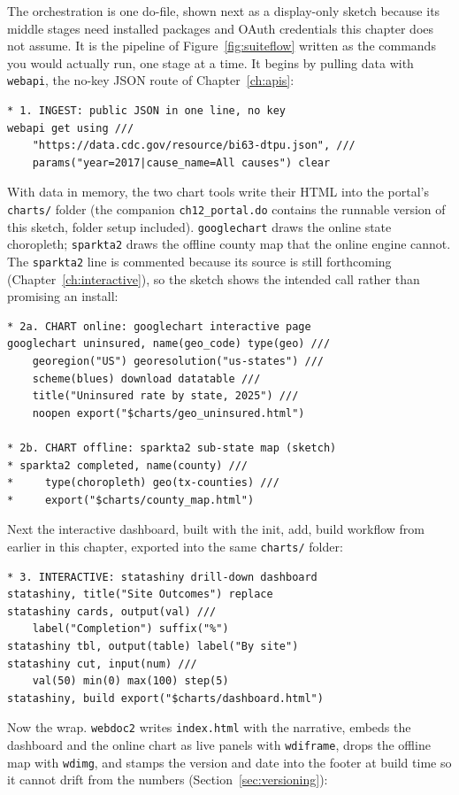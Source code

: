 The orchestration is one do-file, shown next as a display-only sketch because its middle stages need installed packages and OAuth credentials this chapter does not assume. It is the pipeline of Figure~\ref{fig:suiteflow} written as the commands you would actually run, one stage at a time. It begins by pulling data with \texttt{webapi}, the no-key JSON route of Chapter~\ref{ch:apis}:
\par
{\footnotesize
\begin{verbatim}
* 1. INGEST: public JSON in one line, no key
webapi get using ///
    "https://data.cdc.gov/resource/bi63-dtpu.json", ///
    params("year=2017|cause_name=All causes") clear
\end{verbatim}
}
With data in memory, the two chart tools write their HTML into the portal's \texttt{charts/} folder (the companion \texttt{ch12\_portal.do} contains the runnable version of this sketch, folder setup included). \texttt{googlechart} draws the online state choropleth; \texttt{sparkta2} draws the offline county map that the online engine cannot. The \texttt{sparkta2} line is commented because its source is still forthcoming (Chapter~\ref{ch:interactive}), so the sketch shows the intended call rather than promising an install:
\par
{\footnotesize
\begin{verbatim}
* 2a. CHART online: googlechart interactive page
googlechart uninsured, name(geo_code) type(geo) ///
    georegion("US") georesolution("us-states") ///
    scheme(blues) download datatable ///
    title("Uninsured rate by state, 2025") ///
    noopen export("$charts/geo_uninsured.html")

* 2b. CHART offline: sparkta2 sub-state map (sketch)
* sparkta2 completed, name(county) ///
*     type(choropleth) geo(tx-counties) ///
*     export("$charts/county_map.html")
\end{verbatim}
}
Next the interactive dashboard, built with the init, add, build workflow from earlier in this chapter, exported into the same \texttt{charts/} folder:
\par
{\footnotesize
\begin{verbatim}
* 3. INTERACTIVE: statashiny drill-down dashboard
statashiny, title("Site Outcomes") replace
statashiny cards, output(val) ///
    label("Completion") suffix("%")
statashiny tbl, output(table) label("By site")
statashiny cut, input(num) ///
    val(50) min(0) max(100) step(5)
statashiny, build export("$charts/dashboard.html")
\end{verbatim}
}
Now the wrap. \texttt{webdoc2} writes \texttt{index.html} with the narrative, embeds the dashboard and the online chart as live panels with \texttt{wdiframe}, drops the offline map with \texttt{wdimg}, and stamps the version and date into the footer at build time so it cannot drift from the numbers (Section~\ref{sec:versioning}):
